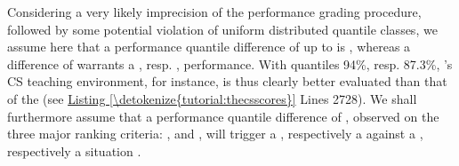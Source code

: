 \documentclass[a4paper,12pt,english]{sphinxhowto}
\begin{document}
Considering a very likely imprecision of the performance grading procedure, followed by some potential violation of uniform distributed quantile classes, we assume here that a performance quantile difference of up to  is , whereas a difference of  warrants a , resp. , performance. With quantiles 94\%, resp. 87.3\%, ’s CS teaching environment, for instance, is thus clearly better evaluated than that of the  (see \hyperref[\detokenize{tutorial:thecsscores}]{Listing \ref{\detokenize{tutorial:thecsscores}}} Lines 27\sphinxhyphen{}28). We shall furthermore assume that a  performance quantile difference of , observed on the three major ranking criteria: ,  and , will trigger a , respectively a  against a , respectively a  situation .
\end{document}
